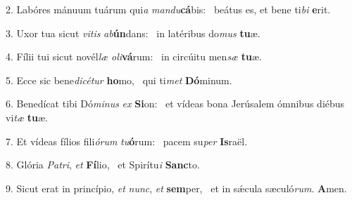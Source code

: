 2. Labóres mánuum tuárum qui\textit{a} \textit{man}\textit{du}\textbf{cá}bis: \ast\  beátus es, et bene ti\textit{bi} \textbf{e}rit.\

3. Uxor tua sicut \textit{vi}\textit{tis} \textit{ab}\textbf{ún}dans: \ast\  in latéribus do\textit{mus} \textbf{tu}æ.\

4. Fílii tui sicut novél\textit{læ} \textit{o}\textit{li}\textbf{vá}rum: \ast\  in circúitu men\textit{sæ} \textbf{tu}æ.\

5. Ecce sic bene\textit{di}\textit{cé}\textit{tur} \textbf{ho}mo, \ast\  qui ti\textit{met} \textbf{Dó}minum.\

6. Benedícat tibi Dó\textit{mi}\textit{nus} \textit{ex} \textbf{Si}on: \ast\  et vídeas bona Jerúsalem ómnibus diébus vi\textit{tæ} \textbf{tu}æ.\

7. Et vídeas fílios fili\textit{ó}\textit{rum} \textit{tu}\textbf{ó}rum: \ast\  pacem su\textit{per} \textbf{Is}raël.\

8. Glória \textit{Pa}\textit{tri}, \textit{et} \textbf{Fí}lio, \ast\  et Spirítu\textit{i} \textbf{Sanc}to.\

9. Sicut erat in princípio, \textit{et} \textit{nunc}, \textit{et} \textbf{sem}per, \ast\  et in sǽcula sæculó\textit{rum}. \textbf{A}men.\

